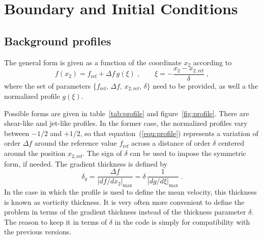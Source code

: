 \chapter{Boundary and Initial Conditions}\label{sec:bcs}

\section{Background profiles}

The general form is given as a function of the coordinate $x_2$ according to
\begin{equation}
  f(x_2) = f_\text{ref}+\Delta f\, g(\xi) \;,\qquad
  \xi=-\frac{x_2-x_{2,\text{ref}}}{\delta} \;,
\label{equ:profile}
\end{equation}
where the set of parameters $\{f_\text{ref},\,\Delta
f,\,x_{2,\text{ref}},\,\delta\}$ need to be provided, as well a the normalized
profile $g(\xi)$. 

Possible forms are given in table~\ref{tab:profile} and
figure~\ref{fig:profile}. There are shear-like and jet-like profiles. In the
former case, the normalized profiles vary between $-1/2$ and $+1/2$, so that
equation~(\ref{equ:profile}) represents a variation of order $\Delta f$ around
the reference value $f_\text{ref}$ across a distance of order $\delta$ centered
around the position $x_{2,\text{ref}}$. The sign of $\delta$ can be used to
impose the symmetric form, if needed. The gradient thickness is defined by
\begin{equation}
  \delta_g =\frac{\Delta f}{|d f/d x_2|_\text{max}} =
  \delta\,\frac{1}{|d g/d \xi|_\text{max}} \;.
\label{equ:deltag}
\end{equation}
In the case in which the profile is used to define the mean velocity, this
thickness is known as vorticity thickness.  It is very often more convenient to
define the problem in terms of the gradient thickness instead of the thickness
parameter $\delta$. The reason to keep it in terms of $\delta$ in the code is
simply for compatibility with the previous versions.

